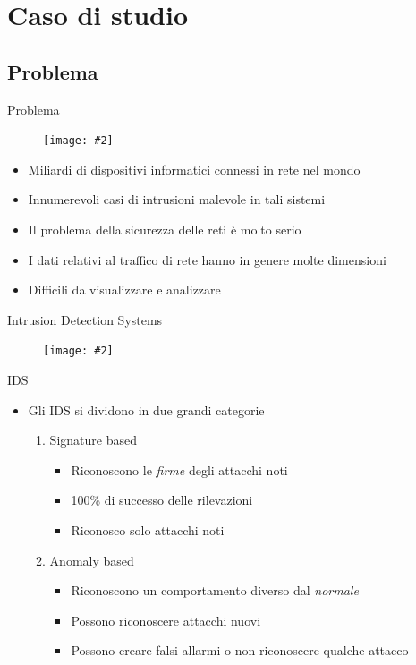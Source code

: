 \documentclass[xcolor={dvipsnames}]{beamer}
\newcommand{\figcen}[2]{
	\begin{figure}
		\begin{center}
			\texttt{[image: \#2]}
		\end{center}
	\end{figure}
}
\begin{document}
\section{Caso di studio}

	\subsection{Problema}

		\begin{frame}{Problema}
			\figcen{.5\textwidth}{iot}
			\begin{itemize}
				\item Miliardi di dispositivi informatici connessi in rete nel mondo
				\item Innumerevoli casi di intrusioni malevole in tali sistemi
				\item Il problema della sicurezza delle reti è molto serio
				\item I dati relativi al traffico di rete hanno in genere molte dimensioni
				\item Difficili da visualizzare e analizzare
			\end{itemize}
		\end{frame}
		
		\begin{frame}{Intrusion Detection Systems}
			\figcen{.5\textwidth}{guardia}
		\end{frame}

		\begin{frame}{IDS}
			\begin{itemize}
				\item Gli IDS si dividono in due grandi categorie
				\begin{enumerate}
					\item Signature based
					\begin{itemize}
						\item Riconoscono le \emph{firme} degli attacchi noti
						\item 100\% di successo delle rilevazioni
						\item Riconosco solo attacchi noti
					\end{itemize}
					\item Anomaly based
					\begin{itemize}
						\item Riconoscono un comportamento diverso dal \emph{normale}
						\item Possono riconoscere attacchi nuovi
						\item Possono creare falsi allarmi o non riconoscere qualche attacco
					\end{itemize}
				\end{enumerate}
			\end{itemize}
		\end{frame}
\end{document}
